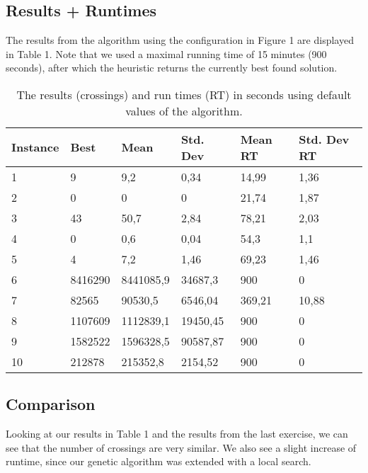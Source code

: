 \documentclass [11pt]{article}
\begin{document}
\subsection{Results + Runtimes}

The results from the algorithm using the configuration in Figure 1 are displayed in Table 1. Note that we used a maximal running time of 15 minutes (900 seconds), after which the heuristic returns the currently best found solution.


\begin{table}[]
\centering
\caption{The results (crossings) and run times (RT) in seconds using default values of the algorithm.}
\label{my-label}
\begin{tabular}{|l|l|l|l|l|l|}
\hline
Instance & Best    & Mean      & Std. Dev & Mean RT & Std. Dev RT \\ \hline
1        & 9       & 9,2       & 0,34     & 14,99   & 1,36        \\ \hline
2        & 0       & 0         & 0        & 21,74   & 1,87        \\ \hline
3        & 43      & 50,7      & 2,84     & 78,21   & 2,03        \\ \hline
4        & 0       & 0,6       & 0,04     & 54,3    & 1,1         \\ \hline
5        & 4       & 7,2       & 1,46     & 69,23   & 1,46        \\ \hline
6        & 8416290 & 8441085,9 & 34687,3  & 900     & 0           \\ \hline
7        & 82565   & 90530,5   & 6546,04  & 369,21  & 10,88       \\ \hline
8        & 1107609 & 1112839,1 & 19450,45 & 900     & 0           \\ \hline
9        & 1582522 & 1596328,5 & 90587,87 & 900     & 0           \\ \hline
10       & 212878  & 215352,8  & 2154,52  & 900     & 0           \\ \hline
\end{tabular}
\end{table}


\subsection{Comparison}


Looking at our results in Table 1 and the results from the last exercise, we can see that the number of crossings are very similar. We also see a slight increase of runtime, since our genetic algorithm was extended with a local search.
\end{document}
